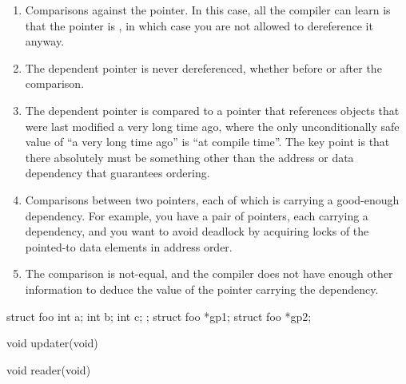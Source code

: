 \begin{enumerate}
\item	Comparisons against the  pointer.
	In this case, all the compiler can learn is that the pointer
	is , in which case you are not allowed to
	dereference it anyway.
\item	The dependent pointer is never dereferenced, whether before or
	after the comparison.
\item	The dependent pointer is compared to a pointer that references
	objects that were last modified a very long time ago, where
	the only unconditionally safe value of ``a very long time ago'' is
	``at compile time''.
	The key point is that there absolutely must be something other
	than the address or data dependency that guarantees ordering.
\item	Comparisons between two pointers, each of which is carrying
	a good-enough dependency.
	For example, you have a pair of pointers, each carrying a
	dependency, and you want to avoid deadlock by acquiring locks
	of the pointed-to data elements in address order.
\item	The comparison is not-equal, and the compiler does not have
	enough other information to deduce the value of the
	pointer carrying the dependency.
\end{enumerate}

\begin{listing}[tbp]
\begin{fcvlabel}
\begin{VerbatimL}[commandchars=\\\[\]]
struct foo {		\lnlbl[foo:b]
	int a;
	int b;
	int c;
};                      \lnlbl[foo:e]
struct foo *gp1;	\lnlbl[gp1]
struct foo *gp2;	\lnlbl[gp2]

void updater(void)						\lnlbl[upd:e]

void reader(void)						\lnlbl[read:e]
\end{VerbatimL}
\end{fcvlabel}
\caption{Broken Dependencies With Pointer Comparisons}
\label{lst:memorder:Broken Dependencies With Pointer Comparisons}
\end{listing}

